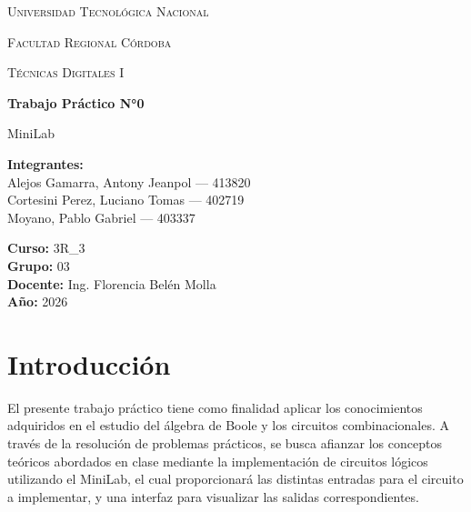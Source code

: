 \documentclass[12pt,a4paper]{report}
\begin{document}

\begin{titlepage}
    \centering

    {\scshape\LARGE Universidad Tecnológica Nacional \par}
    \vspace{0.3cm}
    {\scshape\Large Facultad Regional Córdoba \par}
    \vspace{1.5cm}

    {\scshape\Large Técnicas Digitales I \par}
    \vspace{2cm}

    {\Huge\bfseries Trabajo Práctico N°0 \par}
    \vspace{0.5cm}
    {\LARGE MiniLab \par}

    \vspace{2cm}

    \begin{flushleft}
    \textbf{Integrantes:} \\
    Alejos Gamarra, Antony Jeanpol --- 413820 \\
    Cortesini Perez, Luciano Tomas  --- 402719 \\
    Moyano, Pablo Gabriel  --- 403337 \\

    \vspace{0.5cm}

    \textbf{Curso:} 3R\_3 \\
    \textbf{Grupo:} 03 \\
    \textbf{Docente:} Ing. Florencia Belén Molla \\
    \textbf{Año:} 2026 \\
    \end{flushleft}

    \vfill

\end{titlepage}
\thispagestyle{empty}

\clearpage
{}

\vspace{1cm}

\tableofcontents
\newpage


\chapter{Introducción}
El presente trabajo práctico tiene como finalidad aplicar los conocimientos adquiridos en el estudio del álgebra de Boole
y los circuitos combinacionales. A través de la resolución de problemas prácticos, se busca afianzar los conceptos teóricos abordados en
clase mediante la implementación de circuitos lógicos utilizando el MiniLab, el cual proporcionará las distintas entradas para el circuito a implementar,
y una interfaz para visualizar las salidas correspondientes.
\end{document}
